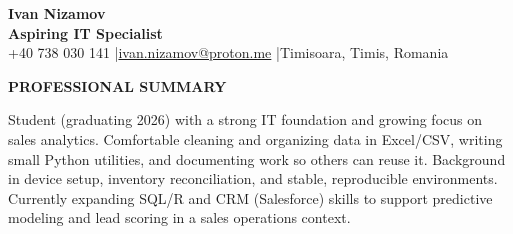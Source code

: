 \documentclass[11pt,a4paper]{article}
\newcommand{\sectionheader}[1]{\vspace{6pt}\textbf{\large #1}\par\vspace{4pt}}
\newcommand{\sep}{\;|\;}
\begin{document}
\pagestyle{empty}

\begin{minipage}[t]{0.75\textwidth}
\vspace{0pt}
\begin{center}
{\LARGE \textbf{Ivan Nizamov}}\\[2pt]
\textbf{Aspiring IT Specialist}\\[6pt]
+40 738 030 141 \sep \href{mailto:ivan.nizamov@proton.me}{ivan.nizamov@proton.me} \sep Timisoara, Timis, Romania
\end{center}
\end{minipage}
\hfill
\begin{minipage}[t]{0.22\textwidth}
\vspace{0pt}
\begin{center}
\end{center}
\end{minipage}

\sectionheader{PROFESSIONAL SUMMARY}
Student (graduating 2026) with a strong IT foundation and growing focus on sales analytics. Comfortable cleaning and organizing data in Excel/CSV, writing small Python utilities, and documenting work so others can reuse it. Background in device setup, inventory reconciliation, and stable, reproducible environments. Currently expanding SQL/R and CRM (Salesforce) skills to support predictive modeling and lead scoring in a sales operations context.
\end{document}
